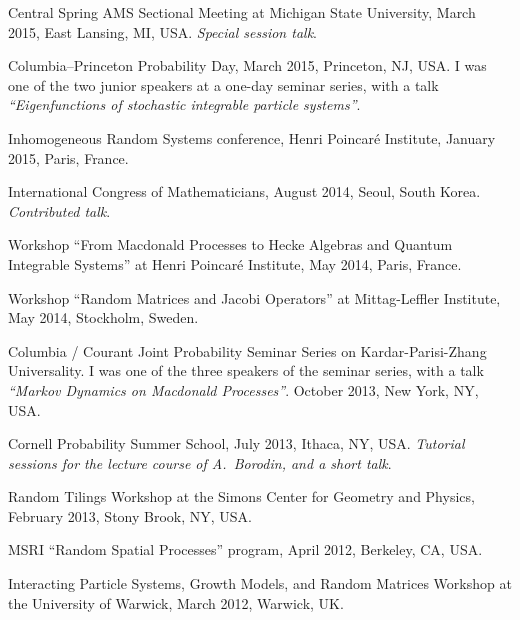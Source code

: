 \documentclass[letterpaper,11pt]{article}
\begin{document}
\begin{etaremune}
	\item
	      Central Spring AMS Sectional Meeting at Michigan State
	      University, March 2015, East Lansing, MI, USA. \emph{Special session talk}.

	\item
	      Columbia--Princeton Probability Day, March 2015, Princeton, NJ,
	      USA. I was one of the two junior speakers at a one-day seminar series, with a
	      talk \emph{``Eigenfunctions of stochastic integrable particle systems''}.

	\item
	      Inhomogeneous Random Systems conference, Henri Poincar\'e
	      Institute, January 2015, Paris, France.

	\item
	      International Congress of Mathematicians, August 2014, Seoul,
	      South Korea. \emph{Contributed talk}.

	\item
	      Workshop ``From Macdonald Processes to Hecke Algebras and
	      Quantum Integrable Systems'' at Henri Poincar\'e Institute, May 2014, Paris,
	      France.

	\item
	      Workshop ``Random Matrices and Jacobi Operators'' at
	      Mittag-Leffler Institute, May 2014, Stockholm, Sweden.

	\item
	      Columbia / Courant Joint Probability Seminar Series on
	      Kardar-Parisi-Zhang Universality. I was one of the three speakers of the
	      seminar series, with a talk \emph{``Markov Dynamics on Macdonald Processes''}.
	      October 2013, New York, NY, USA.

	\item
	      Cornell Probability Summer School, July 2013, Ithaca, NY, USA.
	      \emph{Tutorial sessions for the lecture course of A.~Borodin, and a short
		      talk}.

	\item
	      Random Tilings Workshop at the Simons Center for Geometry and
	      Physics, February 2013, Stony Brook, NY, USA.

	\item
	      MSRI ``Random Spatial Processes'' program, April 2012, Berkeley,
	      CA, USA.

	\item
	      Interacting Particle Systems, Growth Models, and Random Matrices
	      Workshop at the University of Warwick, March 2012, Warwick, UK.


\end{etaremune}
\end{document}
